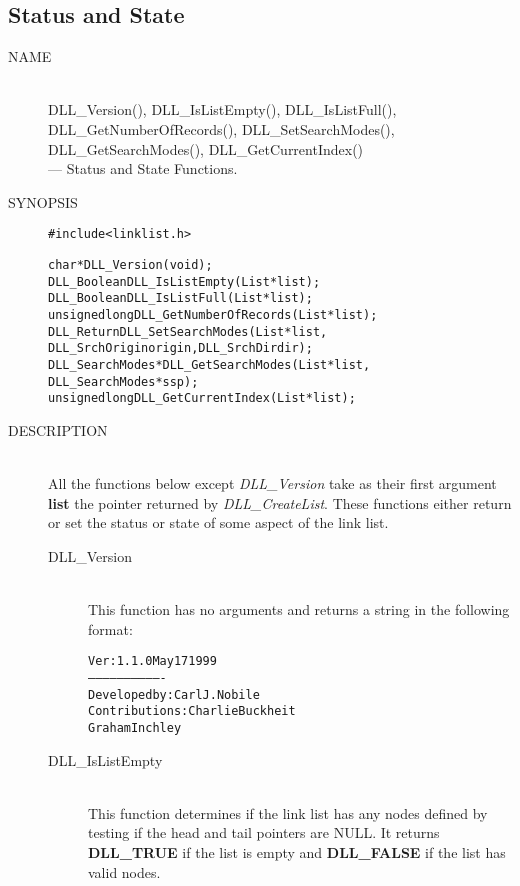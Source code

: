 \documentclass[10pt,letterpaper,titlepage]{article}
\begin{document}
\subsection{Status and State}
\begin{description}
\item[NAME]\quad\\
DLL\_Version(), DLL\_IsListEmpty(), DLL\_IsListFull(),\\
DLL\_GetNumberOfRecords(), DLL\_SetSearchModes(),\\
DLL\_GetSearchModes(), DLL\_GetCurrentIndex()\\
 --- Status and State Functions.

\item[SYNOPSIS]
\begin{alltt}

#include <linklist.h>

char *DLL_Version(void);
DLL_Boolean DLL_IsListEmpty(List *list);
DLL_Boolean DLL_IsListFull(List *list);
unsigned long DLL_GetNumberOfRecords(List *list);
DLL_Return DLL_SetSearchModes(List *list,
   DLL_SrchOrigin origin, DLL_SrchDir dir);
DLL_SearchModes *DLL_GetSearchModes(List *list,
   DLL_SearchModes *ssp);
unsigned long DLL_GetCurrentIndex(List *list);
\end{alltt}

\item[DESCRIPTION]\quad\\
All the functions below except \emph{DLL\_Version} take as their first argument \textbf{list} the pointer returned by \emph{DLL\_CreateList}.  These functions either return or set the status or state of some aspect of the link list.

 \begin{description}
 \item[DLL\_Version]\quad\\
 This function has no arguments and returns a string in the following format:
 \begin{alltt}
Ver: 1.1.0  May 17 1999
-------------------------------
 Developed by: Carl J. Nobile
Contributions: Charlie Buckheit
               Graham Inchley
 \end{alltt}
 \vspace{-16pt}
 \item[DLL\_IsListEmpty]\quad\\
 This function determines if the link list has any nodes defined by testing if the head and tail pointers are NULL.  It returns \textbf{DLL\_TRUE} if the list is empty and \textbf{DLL\_FALSE} if the list has valid nodes.


\end{description}
\end{description}
\end{document}
